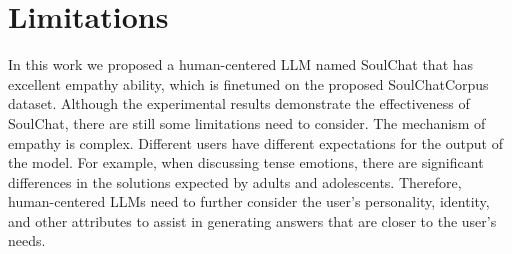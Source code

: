 \documentclass[11pt]{article}
\begin{document}
\section*{Limitations}
In this work we proposed a human-centered LLM named SoulChat that has excellent empathy ability, which is finetuned on the proposed SoulChatCorpus dataset. Although the experimental results demonstrate the effectiveness of SoulChat, there are still some limitations need to consider. The mechanism of empathy is complex. Different users have different expectations for the output of the model. For example, when discussing tense emotions, there are significant differences in the solutions expected by adults and adolescents. Therefore, human-centered LLMs need to further consider the user's personality, identity, and other attributes to assist in generating answers that are closer to the user's needs.
\end{document}
